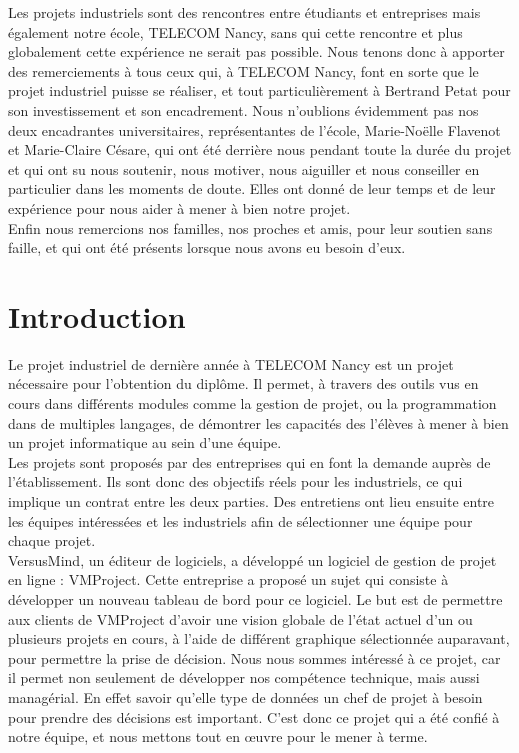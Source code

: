 \documentclass[12pt]{report}
\begin{document}
Les projets industriels sont des rencontres entre étudiants et entreprises mais également notre école, TELECOM Nancy, sans qui cette rencontre et plus globalement cette expérience ne serait pas possible. Nous tenons donc à apporter des remerciements à tous ceux qui, à TELECOM Nancy, font en sorte que le projet industriel puisse se réaliser, et tout particulièrement à Bertrand Petat pour son investissement et son encadrement. Nous n'oublions évidemment pas nos deux encadrantes universitaires, représentantes de l'école, Marie-Noëlle Flavenot et Marie-Claire Césare, qui ont été derrière nous pendant toute la durée du projet et qui ont su nous soutenir, nous motiver, nous aiguiller et nous conseiller en particulier dans les moments de doute. Elles ont donné de leur temps et de leur expérience pour nous aider à mener à bien notre projet.\\

Enfin nous remercions nos familles, nos proches et amis, pour leur soutien sans faille, et qui ont été présents lorsque nous avons eu besoin d'eux.\\

\tableofcontents
\listoffigures


\chapter*{Introduction}

Le projet industriel de dernière année à TELECOM Nancy est un projet nécessaire pour l’obtention du diplôme. Il permet, à travers des outils vus en cours dans différents modules comme la gestion de projet, ou la programmation dans de multiples langages, de démontrer les capacités des l'élèves à mener à bien un projet informatique au sein d'une équipe.\\

Les projets sont proposés par des entreprises qui en font la demande auprès de l’établissement. Ils sont donc des objectifs réels pour les industriels, ce qui implique un contrat entre les deux parties. Des entretiens ont lieu ensuite entre les équipes intéressées et les industriels afin de sélectionner une équipe pour chaque projet.\\

VersusMind, un éditeur de logiciels, a développé un logiciel de gestion de projet en ligne : VMProject. Cette entreprise a proposé un sujet qui consiste à développer un nouveau tableau de bord pour ce logiciel. Le but est de permettre aux clients de VMProject d’avoir une vision globale de l’état actuel d’un ou plusieurs projets en cours, à l’aide de différent graphique sélectionnée auparavant, pour permettre la prise de décision. Nous nous sommes intéressé à ce projet, car il permet non seulement de développer nos compétence technique, mais aussi managérial. En effet savoir qu’elle type de données un chef de projet à besoin pour prendre des décisions est important. C’est donc ce projet qui a été confié à notre équipe, et nous mettons tout en œuvre pour le mener à terme.\\
\end{document}
